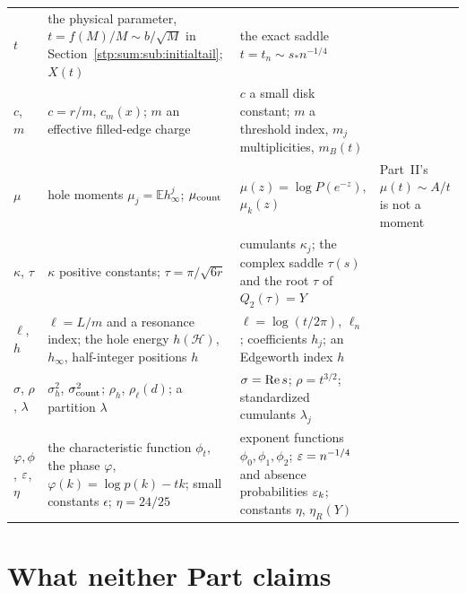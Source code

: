 \documentclass[11pt]{article}
\theoremstyle{remark}\newtheorem{remark}[theorem]{Remark}
\newcommand{\E}{\mathbb E}
\newcommand{\cH}{\mathcal H}
\begin{document}
\begin{small}
\begin{longtable}{@{}>{\raggedright\arraybackslash}p{}>{\raggedright\arraybackslash}p{}>{\raggedright\arraybackslash}p{}>{\raggedright\arraybackslash}p{}@{}}
$t$ & the physical parameter, $t=f(M)/M\sim b/\sqrt M$ in Section~\ref{stp:sum:sub:initialtail}; $X(t)$ & the exact saddle $t=t_n\sim s_*n^{-1/4}$ & \\
$c$, $m$ & $c=r/m$, $c_m(x)$; $m$ an effective filled-edge charge & $c$ a small disk constant; $m$ a threshold index, $m_j$ multiplicities, $m_B(t)$ & \\
$\mu$ & hole moments $\mu_j=\E h_\infty^j$; $\mu_{\rm count}$ & $\mu(z)=\log P(e^{-z})$, $\mu_k(z)$ & Part~II's $\mu(t)\sim A/t$ is not a moment\\
$\kappa$, $\tau$ & $\kappa$ positive constants; $\tau=\pi/\sqrt{6r}$ & cumulants $\kappa_j$; the complex saddle $\tau(s)$ and the root $\tau$ of $Q_2(\tau)=Y$ & \\
$\ell$, $h$ & $\ell=L/m$ and a resonance index; the hole energy $h(\cH)$, $h_\infty$, half-integer positions $h$ & $\ell=\log(t/2\pi)$, $\ell_n$; coefficients $h_j$; an Edgeworth index $h$ & \\
$\sigma$, $\rho$, $\lambda$ & $\sigma_h^2$, $\sigma^2_{\rm count}$; $\rho_h$, $\rho_\ell(d)$; a partition $\lambda$ & $\sigma=\operatorname{Re} s$; $\rho=t^{3/2}$; standardized cumulants $\lambda_j$ & \\
$\varphi,\phi$, $\varepsilon$, $\eta$ & the characteristic function $\phi_t$, the phase $\varphi$, $\varphi(k)=\log p(k)-tk$; small constants $\epsilon$; $\eta=24/25$ & exponent functions $\phi_0,\phi_1,\phi_2$; $\varepsilon=n^{-1/4}$ and absence probabilities $\varepsilon_k$; constants $\eta$, $\eta_R(Y)$ & \\
\bottomrule
\end{longtable}
\end{small}

\section{What neither Part claims}\label{stp:sec:limits}
\end{document}

